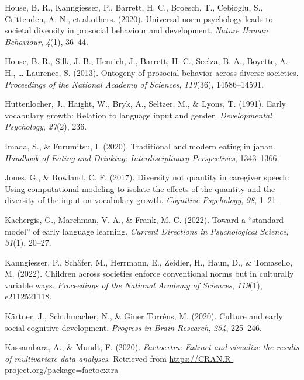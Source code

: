 \documentclass[
  man,floatsintext]{apa6}
\newlength{\cslhangindent}
\newlength{\cslentryspacingunit} %
\newenvironment{CSLReferences}[2] %
 {%
  \setlength{\parindent}{0pt}
  \ifodd #1
  \let\oldpar\par
  \def\par{\hangindent=\cslhangindent\oldpar}
  \fi
  \setlength{\parskip}{#2\cslentryspacingunit}
 }%
 {}
\begin{document}
\begin{CSLReferences}{1}{0}
\leavevmode{}%
House, B. R., Kanngiesser, P., Barrett, H. C., Broesch, T., Cebioglu, S., Crittenden, A. N., et al.others. (2020). Universal norm psychology leads to societal diversity in prosocial behaviour and development. \emph{Nature Human Behaviour}, \emph{4}(1), 36--44.

\leavevmode{}%
House, B. R., Silk, J. B., Henrich, J., Barrett, H. C., Scelza, B. A., Boyette, A. H., \ldots{} Laurence, S. (2013). Ontogeny of prosocial behavior across diverse societies. \emph{Proceedings of the National Academy of Sciences}, \emph{110}(36), 14586--14591.

\leavevmode{}%
Huttenlocher, J., Haight, W., Bryk, A., Seltzer, M., \& Lyons, T. (1991). Early vocabulary growth: Relation to language input and gender. \emph{Developmental Psychology}, \emph{27}(2), 236.

\leavevmode{}%
Imada, S., \& Furumitsu, I. (2020). Traditional and modern eating in japan. \emph{Handbook of Eating and Drinking: Interdisciplinary Perspectives}, 1343--1366.

\leavevmode{}%
Jones, G., \& Rowland, C. F. (2017). Diversity not quantity in caregiver speech: Using computational modeling to isolate the effects of the quantity and the diversity of the input on vocabulary growth. \emph{Cognitive Psychology}, \emph{98}, 1--21.

\leavevmode{}%
Kachergis, G., Marchman, V. A., \& Frank, M. C. (2022). Toward a {``standard model''} of early language learning. \emph{Current Directions in Psychological Science}, \emph{31}(1), 20--27.

\leavevmode{}%
Kanngiesser, P., Schäfer, M., Herrmann, E., Zeidler, H., Haun, D., \& Tomasello, M. (2022). Children across societies enforce conventional norms but in culturally variable ways. \emph{Proceedings of the National Academy of Sciences}, \emph{119}(1), e2112521118.

\leavevmode{}%
Kärtner, J., Schuhmacher, N., \& Giner Torréns, M. (2020). Culture and early social-cognitive development. \emph{Progress in Brain Research}, \emph{254}, 225--246.

\leavevmode{}%
Kassambara, A., \& Mundt, F. (2020). \emph{Factoextra: Extract and visualize the results of multivariate data analyses}. Retrieved from \url{https://CRAN.R-project.org/package=factoextra}


\end{CSLReferences}
\end{document}
